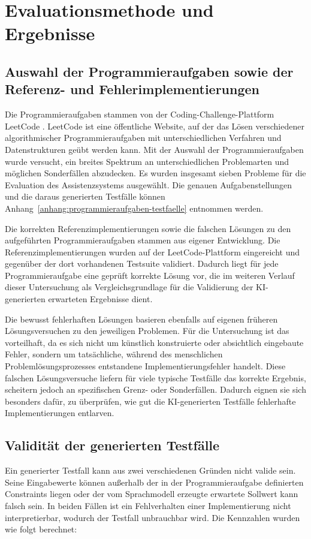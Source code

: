 \section{Evaluationsmethode und Ergebnisse}

\subsection{Auswahl der Programmieraufgaben sowie der Referenz- und Fehlerimplementierungen}
Die Programmieraufgaben stammen von der Coding-Challenge-Plattform LeetCode \cite{leetcode_problemset}. LeetCode ist eine öffentliche Website, auf der das Lösen verschiedener 
algorithmischer Programmieraufgaben mit unterschiedlichen Verfahren und Datenstrukturen geübt werden kann. Mit der Auswahl der Programmieraufgaben wurde versucht, ein breites 
Spektrum an unterschiedlichen Problemarten und möglichen Sonderfällen abzudecken. Es wurden insgesamt sieben Probleme für die Evaluation des Assistenzsystems ausgewählt.
Die genauen Aufgabenstellungen und die daraus generierten Testfälle können Anhang~\ref{anhang:programmieraufgaben-testfaelle} entnommen werden.

Die korrekten Referenzimplementierungen sowie die falschen Lösungen zu den aufgeführten Programmieraufgaben stammen aus eigener Entwicklung. Die Referenzimplementierungen 
wurden auf der LeetCode-Plattform eingereicht und gegenüber der dort vorhandenen Testsuite validiert. Dadurch liegt für jede Programmieraufgabe eine geprüft korrekte Lösung vor, 
die im weiteren Verlauf dieser Untersuchung als Vergleichsgrundlage für die Validierung der \ac{KI}-generierten erwarteten Ergebnisse dient. 

Die bewusst fehlerhaften Lösungen basieren ebenfalls auf eigenen früheren Lösungsversuchen zu den jeweiligen Problemen. Für die Untersuchung ist das 
vorteilhaft, da es sich nicht um künstlich konstruierte oder absichtlich eingebaute Fehler, sondern um tatsächliche, während des menschlichen Problemlösungsprozesses 
entstandene Implementierungsfehler handelt. Diese falschen Lösungsversuche liefern für viele typische Testfälle das korrekte Ergebnis, scheitern jedoch an spezifischen Grenz- 
oder Sonderfällen. Dadurch eignen sie sich besonders dafür, zu überprüfen, wie gut die \ac{KI}-generierten Testfälle fehlerhafte Implementierungen entlarven.
\clearpage
\subsection{Validität der generierten Testfälle}
Ein generierter Testfall kann aus zwei verschiedenen Gründen nicht valide sein. Seine Eingabewerte können außerhalb der in der
Programmieraufgabe definierten Constraints liegen oder der vom Sprachmodell
erzeugte erwartete Sollwert kann falsch sein. In beiden Fällen ist ein Fehlverhalten einer 
Implementierung nicht interpretierbar, wodurch der Testfall unbrauchbar wird. Die Kennzahlen wurden wie folgt berechnet:

